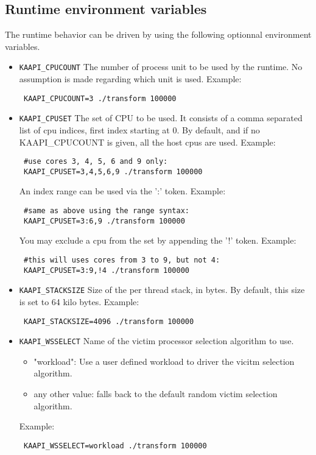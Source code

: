 \documentclass{article}
\begin{document}
\subsection{Runtime environment variables}
The runtime behavior can be driven by using the following
optionnal environment variables.

\begin{itemize} %

\item \verb+KAAPI_CPUCOUNT+\newline
The number of process unit to be used by the runtime.
No assumption is made regarding which unit is used.
Example:
\begin{verbatim}
 KAAPI_CPUCOUNT=3 ./transform 100000
\end{verbatim}

\item \verb+KAAPI_CPUSET+\newline
The set of CPU to be used. It consists of a comma
separated list of cpu indices, first index starting
at 0. By default, and if no KAAPI\_CPUCOUNT is given,
all the host cpus are used.
Example:
\begin{verbatim}
 #use cores 3, 4, 5, 6 and 9 only:
 KAAPI_CPUSET=3,4,5,6,9 ./transform 100000
\end{verbatim}

An index range can be used via the ':' token.
Example:
\begin{verbatim}
 #same as above using the range syntax:
 KAAPI_CPUSET=3:6,9 ./transform 100000
\end{verbatim}

You may exclude a cpu from the set by appending the '!' token.
Example:
\begin{verbatim}
 #this will uses cores from 3 to 9, but not 4:
 KAAPI_CPUSET=3:9,!4 ./transform 100000
\end{verbatim}

\item \verb+KAAPI_STACKSIZE+\newline
Size of the per thread stack, in bytes. By default, this size
is set to 64 kilo bytes.
Example:
\begin{verbatim}
 KAAPI_STACKSIZE=4096 ./transform 100000
\end{verbatim}

\item \verb+KAAPI_WSSELECT+\newline
Name of the victim processor selection algorithm to use.
\begin{itemize}
\item "workload":
Use a user defined workload to driver the vicitm selection algorithm.
\item any other value: falls back to the default random victim selection
algorithm.
\end{itemize}
Example:
\begin{verbatim}
 KAAPI_WSSELECT=workload ./transform 100000
\end{verbatim}
\end{itemize} %
\end{document}
